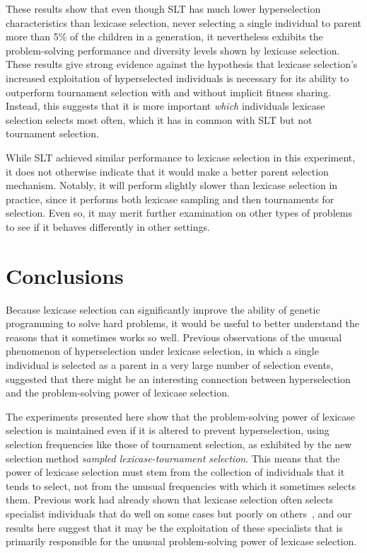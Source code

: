 \documentclass{sig-alternate}
\begin{document}
These results show that even though SLT has much lower hyperselection characteristics than lexicase selection, never selecting a single individual to parent more than 5\% of the children in a generation, it nevertheless exhibits the problem-solving performance and diversity levels shown by lexicase selection. These results give strong evidence against the hypothesis that lexicase selection's increased exploitation of hyperselected individuals is necessary for its ability to outperform tournament selection with and without implicit fitness sharing. Instead, this suggests that it is more important \textit{which} individuals lexicase selection selects most often, which it has in common with SLT but not tournament selection.

While SLT achieved similar performance to lexicase selection in this experiment, it does not otherwise indicate that it would make a better parent selection mechanism. Notably, it will perform slightly slower than lexicase selection in practice, since it performs both lexicase sampling and then tournaments for selection. Even so, it may merit further examination on other types of problems to see if it behaves differently in other settings.


\section{Conclusions}
\label{section:conclusions}

Because lexicase selection can significantly improve the ability of genetic programming to solve hard problems, it would be useful to better understand the reasons that it sometimes works so well. Previous observations of the unusual phenomenon of hyperselection under lexicase selection, in which a single individual is selected as a parent in a very large number of selection events, suggested that there might be an interesting connection between hyperselection and the problem-solving power of lexicase selection.

The experiments presented here show that the problem-solving power of lexicase selection is maintained even if it is altered to prevent hyperselection, using selection frequencies like those of tournament selection, as exhibited by the new selection method \textit{sampled lexicase-tournament selection}. This means that the power of lexicase selection must stem from the collection of individuals that it tends to select, not from the unusual frequencies with which it sometimes selects them. Previous work had already shown that lexicase selection often selects specialist individuals that do well on some cases but poorly on others~\cite{Helmuth:2015:GPTP,Helmuth:2015:dissertation}, and our results here suggest that it may be the exploitation of these specialists that is primarily responsible for the unusual problem-solving power of lexicase selection.
\end{document}
